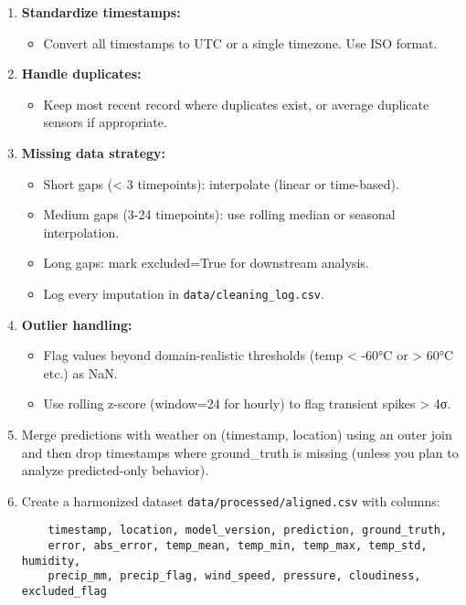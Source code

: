 \documentclass[11pt,a4paper]{article}
\begin{document}
\begin{enumerate}[label=\arabic*.]
    \item \textbf{Standardize timestamps:}
    \begin{itemize}
        \item Convert all timestamps to UTC or a single timezone. Use ISO format.
    \end{itemize}
    
    \item \textbf{Handle duplicates:}
    \begin{itemize}
        \item Keep most recent record where duplicates exist, or average duplicate sensors if appropriate.
    \end{itemize}
    
    \item \textbf{Missing data strategy:}
    \begin{itemize}
        \item Short gaps (< 3 timepoints): interpolate (linear or time-based).
        \item Medium gaps (3-24 timepoints): use rolling median or seasonal interpolation.
        \item Long gaps: mark excluded=True for downstream analysis.
        \item Log every imputation in \texttt{data/cleaning\_log.csv}.
    \end{itemize}
    
    \item \textbf{Outlier handling:}
    \begin{itemize}
        \item Flag values beyond domain-realistic thresholds (temp < -60°C or > 60°C etc.) as NaN.
        \item Use rolling z-score (window=24 for hourly) to flag transient spikes > 4σ.
    \end{itemize}
    
    \item Merge predictions with weather on (timestamp, location) using an outer join and then drop timestamps where ground\_truth is missing (unless you plan to analyze predicted-only behavior).
    
    \item Create a harmonized dataset \texttt{data/processed/aligned.csv} with columns:
    \begin{verbatim}
    timestamp, location, model_version, prediction, ground_truth,
    error, abs_error, temp_mean, temp_min, temp_max, temp_std, humidity, 
    precip_mm, precip_flag, wind_speed, pressure, cloudiness, excluded_flag
    \end{verbatim}
\end{enumerate}
\end{document}
